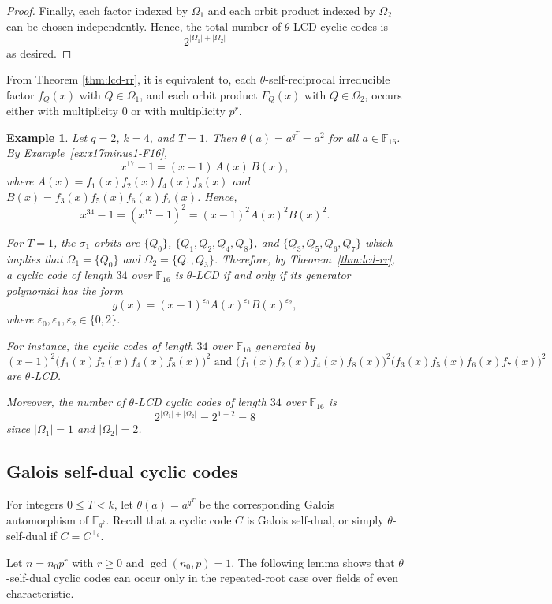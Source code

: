 \documentclass[pdflatex,sn-mathphys-num]{sn-jnl}%
\theoremstyle{thmstyleone}%
\theoremstyle{thmstyletwo}%
\newtheorem{example}{Example}%
\theoremstyle{thmstylethree}%
\newcommand{\F}{\mathbb{F}}
\begin{document}
\begin{proof}
Finally, each factor indexed by $\Omega_1$ and each orbit product indexed by $\Omega_2$ can be chosen independently. Hence, the total number of $\theta$-LCD cyclic codes is
\[
2^{|\Omega_1|+|\Omega_2|}
\]as desired.
\end{proof}
 
From Theorem \ref{thm:lcd-rr}, it  is equivalent to, each $\theta$-self-reciprocal irreducible factor $f_Q(x)$ with $Q\in\Omega_1$, and each orbit product $F_Q(x)$ with $Q\in\Omega_2$, occurs either with multiplicity $0$ or with multiplicity $p^r$.
 

 \begin{example}
Let $q=2$, $k=4$, and $T=1$. Then
$
\theta(a)=a^{q^T}=a^2$ for all $a\in \F_{16}$.
By Example~\ref{ex:x17minus1-F16},
\[
x^{17}-1
=
(x-1)\,A(x)\,B(x),
\]
where
$
A(x)=f_1(x)f_2(x)f_4(x)f_8(x)$ and $
B(x)=f_3(x)f_5(x)f_6(x)f_7(x)$.
Hence,
\[
x^{34}-1=(x^{17}-1)^2=(x-1)^2A(x)^2B(x)^2.
\]

For $T=1$, the $\sigma_1$-orbits are
$
\{Q_0\}$, $\{Q_1,Q_2,Q_4,Q_8\}$, and $\{Q_3,Q_5,Q_6,Q_7\}$ which implies that
$
\Omega_1=\{Q_0\} $ and $
\Omega_2=\{Q_1,Q_3\}$.
Therefore, by Theorem~\ref{thm:lcd-rr}, a cyclic code of length $34$ over $\F_{16}$ is $\theta$-LCD if and only if its generator polynomial has the form
\[
g(x)=(x-1)^{\varepsilon_0}A(x)^{\varepsilon_1}B(x)^{\varepsilon_2},
\]
where $\varepsilon_0,\varepsilon_1,\varepsilon_2\in\{0,2\}$.


For instance, the cyclic codes of length $34$ over $\F_{16}$ generated by
\[
(x-1)^2\bigl(f_1(x)f_2(x)f_4(x)f_8(x)\bigr)^2 \text{ and  } \bigl(f_1(x)f_2(x)f_4(x)f_8(x)\bigr)^2 \bigl(f_3(x)f_5(x)f_6(x)f_7(x)\bigr)^2\]
are  $\theta$-LCD.

Moreover,  the number of $\theta$-LCD cyclic codes of length $34$ over $\F_{16}$ is
\[
2^{|\Omega_1|+|\Omega_2|}=2^{1+2}=8
\] since $|\Omega_1|=1$ and $|\Omega_2|=2$.
\end{example}

 \subsection{Galois self-dual  cyclic codes}

For integers $0\le T<k$, let $
\theta(a)=a^{q^T} $
be the corresponding Galois automorphism of $\F_{q^k}$. Recall that a cyclic code $C$ is  {Galois self-dual}, or simply {$\theta$-self-dual} if $
C=C^{\perp_\theta}$.

  Let
$
n=n_0p^r$ 
with $r\ge 0$ and $\gcd(n_0,p)=1$. The following lemma shows that $\theta$-self-dual cyclic codes can occur only in the repeated-root case over fields of even characteristic.
\end{document}
